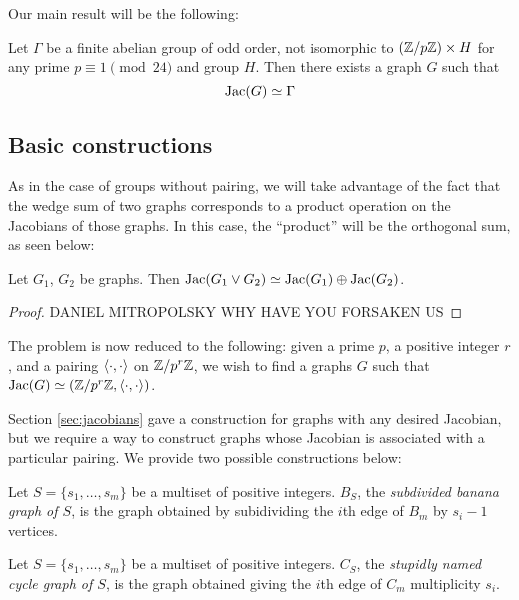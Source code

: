 \documentclass{amsart}
\begin{document}
Our main result will be the following:

\begin{thm}
  \label{thm:graph_pairing}
  Let $\Gamma$ be a finite abelian group of odd order, not isomorphic
  to $(\mathbb{Z}/p\mathbb{Z}) \times H$ for any prime $p \equiv 1 \pmod {24}$ and
  group $H$. Then there exists a graph $G$ such that
  \[
  \operatorname{Jac}(G) \simeq \Gamma
  \]
\end{thm}

\subsection{Basic constructions}

As in the case of groups without pairing, we will take advantage of
the fact that the wedge sum of two graphs corresponds to a product
operation on the Jacobians of those graphs. In this case, the
``product'' will be the orthogonal sum, as seen below:

\begin{prop}
  \label{prop:wedge_sum}
  Let $G_1$, $G_2$ be graphs. Then $\operatorname{Jac}(G_1 \vee G_2) \simeq
  \operatorname{Jac}(G_1) \oplus \operatorname{Jac}(G_2)$. 
\end{prop}
\begin{proof}
  DANIEL MITROPOLSKY WHY HAVE YOU FORSAKEN US
\end{proof}

The problem is now reduced to the following: given a prime $p$, a
positive integer $r$, and a pairing $\langle \cdot, \cdot \rangle$ on
$\mathbb{Z}/p^r\mathbb{Z}$, we wish to find a graphs $G$ such that $\operatorname{Jac}(G) \simeq
(\mathbb{Z}/p^r\mathbb{Z}, \langle \cdot, \cdot \rangle)$.

Section \ref{sec:jacobians} gave a construction for graphs with any
desired Jacobian, but we require a way to construct graphs whose
Jacobian is associated with a particular pairing. We provide two
possible constructions below:

\begin{defn}
  Let $S = \{s_1, \ldots, s_m\}$ be a multiset of positive
  integers. $B_S$, the \emph{subdivided banana graph of $S$}, is the
  graph obtained by subidividing the $i$th edge of $B_m$ by $s_i-1$
  vertices.
\end{defn}

\begin{defn}
  Let $S = \{s_1, \ldots, s_m\}$ be a multiset of positive
  integers. $C_S$, the \emph{stupidly named cycle graph of $S$}, is
  the graph obtained giving the $i$th edge of $C_m$ multiplicity
  $s_i$.
\end{defn}
\end{document}
